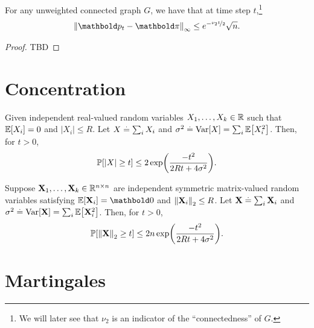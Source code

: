 \begin{thm}
For any unweighted connected graph $G$, we have that at time step $t$,\footnote{We will later see that $\nu_2$ is an indicator of the ``connectedness'' of $G$.} \begin{align}
    \norm{\vp_t - \vpi}_\infty \leq e^{-\nicefrac{\nu_2 t}{2}}\sqrt{n}.
\end{align}
\end{thm}
\begin{proof}
TBD
\end{proof}

\section{Concentration}

\begin{thm} Given independent real-valued random variables $X_1, \dots, X_k \in \mathbb{R}$ such that $\E{X_i} = 0$ and $|X_i| \leq R$. Let $X \overset{.}{=} \sum_i X_i$ and $\sigma^2 \defeq \Var{X} = \sum_i \E{X_i^2}$. Then, for $t > 0$, \begin{align}
    \Pr{|X| \geq t} \leq 2 \exp\parentheses*{\frac{-t^2}{2Rt + 4\sigma^2}}.
\end{align}
\end{thm}

\begin{thm} Suppose $\mathbf{X}_1, \dots, \mathbf{X}_k \in \mathbb{R}^{n \times n}$ are independent symmetric matrix-valued random variables satisfying $\E{\rX_i} = \mZero$ and $\left\| \mathbf{X}_i \right\|_2 \leq R$. Let $\mathbf{X} \overset{.}{=} \sum_i \mathbf{X}_i$ and $\sigma^2 \defeq \Var{\rX} = \sum_i \E{\rX_i^2}$. Then, for $t > 0$, \begin{align}
    \Pr{\norm{\rX}_2 \geq t} \leq 2 n \exp\parentheses*{\frac{-t^2}{2Rt + 4\sigma^2}}.
\end{align}
\end{thm}

\section{Martingales}